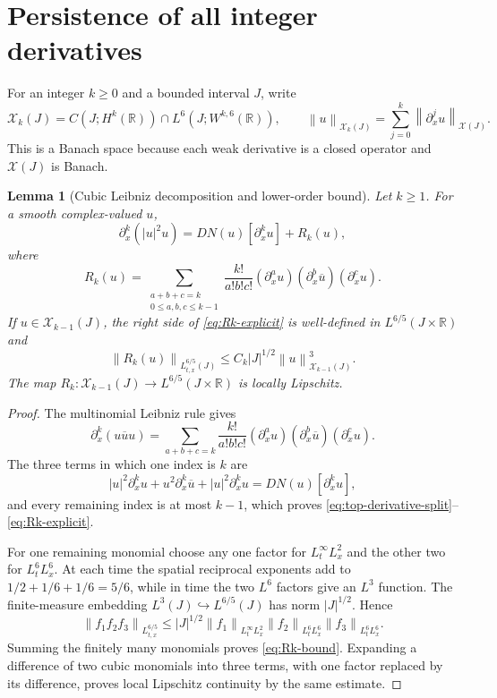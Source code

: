 \documentclass[11pt,oneside]{book}
\newtheorem{lemma}[theorem]{Lemma}
\theoremstyle{definition}
\theoremstyle{remark}
\newcommand{\R}{\mathbb R}
\newcommand{\1}{\mathbf 1}
\newcommand{\norm}[1]{\left\lVert #1\right\rVert}
\begin{document}
\section{Persistence of all integer derivatives}

For an integer $k\ge0$ and a bounded interval $J$, write
\[
 \mathcal X_k(J)=C(J;H^k(\R))\cap L^6(J;W^{k,6}(\R)),
 \qquad
 \norm u_{\mathcal X_k(J)}
 =\sum_{j=0}^k\norm{\partial_x^ju}_{\mathcal X(J)}.
\]
This is a Banach space because each weak derivative is a closed operator and
$\mathcal X(J)$ is Banach.

\begin{lemma}[Cubic Leibniz decomposition and lower-order bound]
\label{lem:cubic-Hk-leibniz}
Let $k\ge1$.  For a smooth complex-valued $u$,
\begin{equation}
 \partial_x^k(|u|^2u)=DN(u)[\partial_x^ku]+R_k(u), \label{eq:top-derivative-split}
\end{equation}
where
\begin{equation}
 R_k(u)=
 \sum_{\substack{a+b+c=k\\0\le a,b,c\le k-1}}
 \frac{k!}{a!b!c!}
 (\partial_x^au)(\partial_x^b\overline u)(\partial_x^cu).       \label{eq:Rk-explicit}
\end{equation}
If $u\in\mathcal X_{k-1}(J)$, the right side of
\eqref{eq:Rk-explicit} is well-defined in $L^{6/5}(J\times\R)$ and
\begin{equation}
 \norm{R_k(u)}_{L^{6/5}_{t,x}(J)}
 \le C_k|J|^{1/2}\norm u_{\mathcal X_{k-1}(J)}^3.               \label{eq:Rk-bound}
\end{equation}
The map $R_k:\mathcal X_{k-1}(J)\to L^{6/5}(J\times\R)$ is locally
Lipschitz.
\end{lemma}

\begin{proof}
The multinomial Leibniz rule gives
\[
 \partial_x^k(u\overline u u)
 =\sum_{a+b+c=k}\frac{k!}{a!b!c!}
   (\partial_x^au)(\partial_x^b\overline u)(\partial_x^cu).
\]
The three terms in which one index is $k$ are
\[
 |u|^2\partial_x^ku
 +u^2\partial_x^k\overline u
 +|u|^2\partial_x^ku
 =DN(u)[\partial_x^ku],
\]
and every remaining index is at most $k-1$, which proves
\eqref{eq:top-derivative-split}--\eqref{eq:Rk-explicit}.

For one remaining monomial choose any one factor for
$L^\infty_tL^2_x$ and the other two for $L^6_tL^6_x$.  At each time the
spatial reciprocal exponents add to
$1/2+1/6+1/6=5/6$, while in time the two $L^6$ factors give an $L^3$
function.  The finite-measure embedding
$L^3(J)\hookrightarrow L^{6/5}(J)$ has norm $|J|^{1/2}$.  Hence
\[
 \norm{f_1f_2f_3}_{L^{6/5}_{t,x}}
 \le |J|^{1/2}\norm{f_1}_{L^\infty_tL^2_x}
                   \norm{f_2}_{L^6_tL^6_x}
                   \norm{f_3}_{L^6_tL^6_x}.
\]
Summing the finitely many monomials proves \eqref{eq:Rk-bound}.  Expanding
a difference of two cubic monomials into three terms, with one factor
replaced by its difference, proves local Lipschitz continuity by the same
estimate.
\end{proof}
\end{document}
